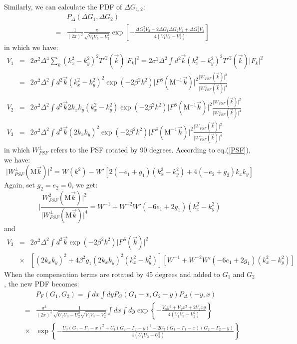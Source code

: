 \documentclass[onecolumn]{aastex62}
\begin{document}
Similarly, we can calculate the PDF of $\Delta G_{1,2}$:
\begin{eqnarray}
&&P_{\Delta}\left(\Delta G_1,\Delta G_2\right)\\ \nonumber
&=&\frac{1}{(2\pi)^2}\frac{\pi}{\sqrt{V_1V_3-V_2^2}}\exp\left[-\frac{\Delta G_1^2V_3-2\Delta G_1\Delta G_2V_2+\Delta G_2^2V_1}{4(V_1V_3-V_2^2)}\right]
\end{eqnarray}
in which we have:
\begin{eqnarray}
V_1&=&2\sigma^2\Delta^4\sum_k\left(k_x^2-k_y^2\right)^2T'^2(\vec{k})\vert F_k\vert^2=2\sigma^2\Delta^2\int{d}^2\vec{k}\left(k_x^2-k_y^2\right)^2T'^2(\vec{k})\vert F_k\vert^2\\ \nonumber
&=&2\sigma^2\Delta^2\int{d}^2\vec{k}\left(k_x^2-k_y^2\right)^2\exp(-2\beta^2k^2)\vert F^S(\mathrm{M}^{-1}\vec{k})\vert^2\frac{\vert W_{PSF}(\vec{k})\vert^2}{\vert W_{PSF}^{\perp}(\vec{k})\vert^4}\\ \nonumber
V_2&=&2\sigma^2\Delta^2\int{d}^2\vec{k}2k_xk_y\left(k_x^2-k_y^2\right)\exp(-2\beta^2k^2)\vert F^S(\mathrm{M}^{-1}\vec{k})\vert^2\frac{\vert W_{PSF}(\vec{k})\vert^2}{\vert W_{PSF}^{\perp}(\vec{k})\vert^4}\\ \nonumber
V_3&=&2\sigma^2\Delta^2\int{d}^2\vec{k}(2k_xk_y)^2\exp(-2\beta^2k^2)\vert F^S(\mathrm{M}^{-1}\vec{k})\vert^2\frac{\vert W_{PSF}(\vec{k})\vert^2}{\vert W_{PSF}^{\perp}(\vec{k})\vert^4}
\end{eqnarray}
in which $W_{PSF}^{\perp}$ refers to the PSF rotated by 90 degrees. According to eq.(\ref{PSF}), we have:
\begin{equation}
\vert W_{PSF}^{\perp}(\mathrm{M}\vec{k})\vert^2=W(k^2)-W'[2(-e_1+g_1)(k_x^2-k_y^2)+4(-e_2+g_2)k_xk_y]
\end{equation}
Again, set $g_2=e_2=0$, we get:
\begin{equation}
\vert \frac{W_{PSF}^{2}(\mathrm{M}\vec{k})\vert^2}{\vert W_{PSF}^{\perp}(\mathrm{M}\vec{k})\vert^4}=W^{-1}+W^{-2}W'(-6e_1+2g_1)(k_x^2-k_y^2)
\end{equation}
and 
\begin{eqnarray}
V_3&=&2\sigma^2\Delta^2\int{d}^2\vec{k}\exp(-2\beta^2k^2)\vert F^S(\vec{k})\vert^2\\ \nonumber
&\times&\left[(2k_xk_y)^2+4\beta^2g_1(2k_xk_y)^2\left(k_x^2-k_y^2\right)\right]\left[W^{-1}+W^{-2}W'(-6e_1+2g_1)(k_x^2-k_y^2)\right]
\end{eqnarray}
When the compensation terms are rotated by 45 degrees and added to $G_1$ and $G_2$, the new PDF becomes:
\begin{eqnarray}
&&P_F(G_1,G_2)=\int dx\int dy P_G(G_1-x,G_2-y)P_{\Delta}(-y,x) \\ \nonumber
&=&\frac{\pi^2}{(2\pi)^4}\frac{1}{\sqrt{U_1U_3-U_2^2}\sqrt{V_1V_3-V_2^2}}\int dx\int dy\exp\left\{-\frac{V_3y^2+V_1x^2+2V_2xy}{4(V_1V_3-V_2^2)}\right\} \\ \nonumber
&\times&\exp\left\{-\frac{U_3(G_1-\Gamma_1-x)^2+U_1(G_2-\Gamma_2-y)^2-2U_2(G_1-\Gamma_1-x)(G_2-\Gamma_2-y)}{4(U_1U_3-U_2^2)}\right\}
\end{eqnarray}
\end{document}
